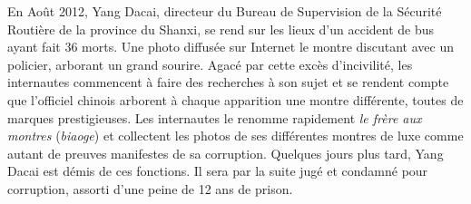 En Août 2012, Yang Dacai, directeur du Bureau de Supervision de la Sécurité Routière de la province du Shanxi, se rend sur les lieux d'un accident de bus ayant fait 36 morts. Une photo diffusée sur Internet le montre discutant avec un policier, arborant un grand sourire. Agacé par cette excès d'incivilité, les internautes commencent à faire des recherches à son sujet et se rendent compte que l'officiel chinois arborent à chaque apparition une montre différente, toutes de marques prestigieuses. Les internautes le renomme rapidement \textit{le frère aux montres} (\textit{biaoge}) et collectent les photos de ses différentes montres de luxe comme autant de preuves manifestes de sa corruption. Quelques jours plus tard, Yang Dacai est démis de ces fonctions. Il sera par la suite jugé et condamné pour corruption, assorti d'une peine de 12 ans de prison. 

